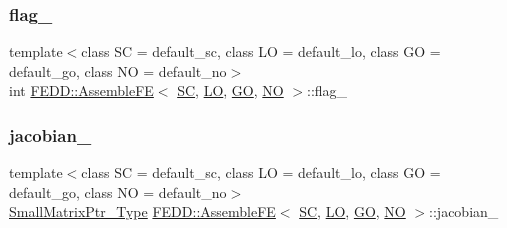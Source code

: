 \subsubsection{\texorpdfstring{flag\+\_\+}{flag\_}}
{\footnotesize\ttfamily template$<$class SC  = default\+\_\+sc, class LO  = default\+\_\+lo, class GO  = default\+\_\+go, class NO  = default\+\_\+no$>$ \\
int \hyperlink{classFEDD_1_1AssembleFE}{F\+E\+D\+D\+::\+Assemble\+FE}$<$ \hyperlink{fe__test__laplace_8cpp_a79c7e86a57edbb2a5a53242bcd04e41e}{SC}, \hyperlink{fe__test__laplace_8cpp_ad6a38c9f07d3fd633eefca5bccad8410}{LO}, \hyperlink{fe__test__laplace_8cpp_afa2946b509009b4f45eb04bd8c5b27d9}{GO}, \hyperlink{fe__test__laplace_8cpp_a5e24f37b28787429872b6ecb1d0417ce}{NO} $>$\+::flag\+\_\+\hspace{0.3cm}{\ttfamily [protected]}}

\mbox{\label{classFEDD_1_1AssembleFE_a12d587892b238ecf6b8fdb0b91c2b0be}} 
\subsubsection{\texorpdfstring{jacobian\+\_\+}{jacobian\_}}
{\footnotesize\ttfamily template$<$class SC  = default\+\_\+sc, class LO  = default\+\_\+lo, class GO  = default\+\_\+go, class NO  = default\+\_\+no$>$ \\
\hyperlink{classFEDD_1_1AssembleFE_afb5fb5dca3aab59f697a25884e99e894}{Small\+Matrix\+Ptr\+\_\+\+Type} \hyperlink{classFEDD_1_1AssembleFE}{F\+E\+D\+D\+::\+Assemble\+FE}$<$ \hyperlink{fe__test__laplace_8cpp_a79c7e86a57edbb2a5a53242bcd04e41e}{SC}, \hyperlink{fe__test__laplace_8cpp_ad6a38c9f07d3fd633eefca5bccad8410}{LO}, \hyperlink{fe__test__laplace_8cpp_afa2946b509009b4f45eb04bd8c5b27d9}{GO}, \hyperlink{fe__test__laplace_8cpp_a5e24f37b28787429872b6ecb1d0417ce}{NO} $>$\+::jacobian\+\_\+\hspace{0.3cm}{\ttfamily [protected]}}

\mbox{\label{classFEDD_1_1AssembleFE_a39520c726ee8a6a48258adc555f6df77}} 

